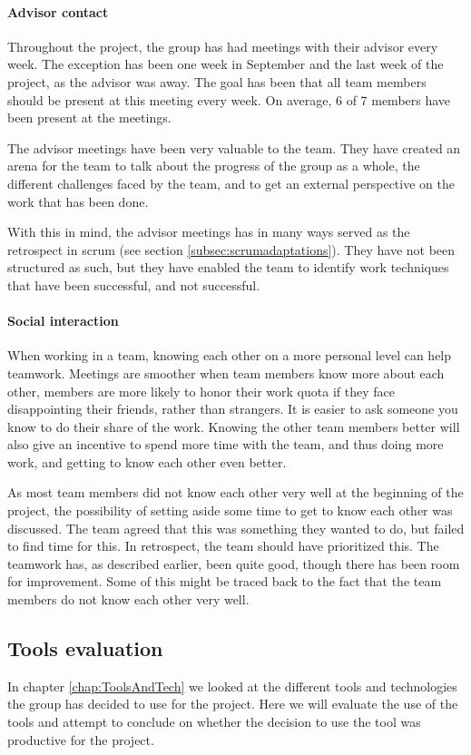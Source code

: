 \documentclass[11pt,a4paper,titlepage,oneside]{report}
\begin{document}
\paragraph{Advisor contact}
Throughout the project, the group has had meetings with their advisor every week. The exception has been one week in September and the last week of the project, as the advisor was away. The goal has been that all team members should be present at this meeting every week. On average, 6 of 7 members have been present at the meetings.

The advisor meetings have been very valuable to the team. They have created an arena for the team to talk about the progress of the group as a whole, the different challenges faced by the team, and to get an external perspective on the work that has been done. 

With this in mind, the advisor meetings has in many ways served as the retrospect in scrum (see section \ref{subsec:scrumadaptations}). They have not been structured as such, but they have enabled the team to identify work techniques that have been successful, and not successful. 

\paragraph{Social interaction}
When working in a team, knowing each other on a more personal level can help teamwork. Meetings are smoother when team members know more about each other, members are more likely to honor their work quota if they face disappointing their friends, rather than strangers. It is easier to ask someone you know to do their share of the work. Knowing the other team members better will also give an incentive to spend more time with the team, and thus doing more work, and getting to know each other even better. \cite{Effective:Teamwork}

As most team members did not know each other very well at the beginning of the project, the possibility of setting aside some time to get to know each other was discussed. The team agreed that this was something they wanted to do, but failed to find time for this. In retrospect, the team should have prioritized this. The teamwork has, as described earlier, been quite good, though there has been room for improvement. Some of this might be traced back to the fact that the team members do not know each other very well.

\subsection{Tools evaluation}
\label{subsec:ToolsEvaluation}
In chapter \ref{chap:ToolsAndTech} we looked at the different tools and technologies the group has decided to use for the project. Here we will evaluate the use of the tools and attempt to conclude on whether the decision to use the tool was productive for the project.
\end{document}
